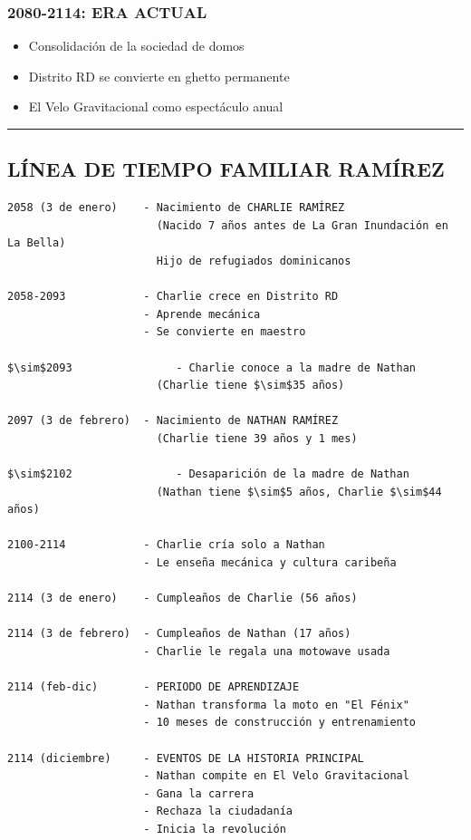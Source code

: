 \documentclass[11pt,a4paper]{report}
\begin{document}
\subsubsection{2080-2114: ERA ACTUAL}
\begin{itemize}
  \item Consolidación de la sociedad de domos
  \item Distrito RD se convierte en ghetto permanente
  \item El Velo Gravitacional como espectáculo anual

\end{itemize}
\bigskip\hrule\bigskip

\subsection{LÍNEA DE TIEMPO FAMILIAR RAMÍREZ}

\begin{verbatim}
2058 (3 de enero)    - Nacimiento de CHARLIE RAMÍREZ
                       (Nacido 7 años antes de La Gran Inundación en La Bella)
                       Hijo de refugiados dominicanos

2058-2093            - Charlie crece en Distrito RD
                     - Aprende mecánica
                     - Se convierte en maestro

$\sim$2093                - Charlie conoce a la madre de Nathan
                       (Charlie tiene $\sim$35 años)

2097 (3 de febrero)  - Nacimiento de NATHAN RAMÍREZ
                       (Charlie tiene 39 años y 1 mes)

$\sim$2102                - Desaparición de la madre de Nathan
                       (Nathan tiene $\sim$5 años, Charlie $\sim$44 años)

2100-2114            - Charlie cría solo a Nathan
                     - Le enseña mecánica y cultura caribeña

2114 (3 de enero)    - Cumpleaños de Charlie (56 años)

2114 (3 de febrero)  - Cumpleaños de Nathan (17 años)
                     - Charlie le regala una motowave usada

2114 (feb-dic)       - PERIODO DE APRENDIZAJE
                     - Nathan transforma la moto en "El Fénix"
                     - 10 meses de construcción y entrenamiento

2114 (diciembre)     - EVENTOS DE LA HISTORIA PRINCIPAL
                     - Nathan compite en El Velo Gravitacional
                     - Gana la carrera
                     - Rechaza la ciudadanía
                     - Inicia la revolución
\end{verbatim}
\end{document}
